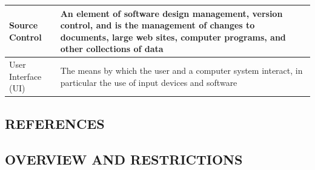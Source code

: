 \documentclass[letterpaper, 10pt, draftclsnofoot, onecolumn]{IEEEtran}
\begin{document}
\begin{flushleft}
\begin{supertabular}{|m{1.3587599in}|m{5.00806in}|}
\color{black} Source Control &
\color{black} An element of software design management, version control, and is the management of changes to documents, large web sites, computer programs, and other collections of data\\\hline
{}\color{black} User Interface (UI) &
\color{black} The means by which the user and a computer system interact, in particular the use of input devices and software\\\hline
\end{supertabular}
\end{flushleft}
\subsection[REFERENCES]{\rmfamily\bfseries\color{black}
REFERENCES}


\subsection[OVERVIEW AND
RESTRICTIONS]{\rmfamily\bfseries\color{black}
OVERVIEW AND RESTRICTIONS}



\bigskip

\end{document}

